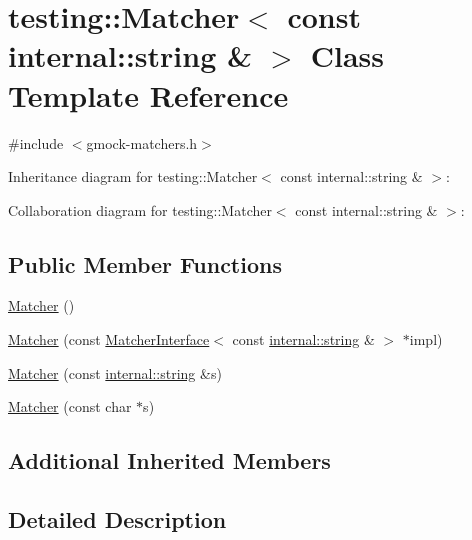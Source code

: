 \hypertarget{classtesting_1_1_matcher_3_01const_01internal_1_1string_01_6_01_4}{}\section{testing\+:\+:Matcher$<$ const internal\+:\+:string \& $>$ Class Template Reference}
\label{classtesting_1_1_matcher_3_01const_01internal_1_1string_01_6_01_4}


{\ttfamily \#include $<$gmock-\/matchers.\+h$>$}



Inheritance diagram for testing\+:\+:Matcher$<$ const internal\+:\+:string \& $>$\+:


Collaboration diagram for testing\+:\+:Matcher$<$ const internal\+:\+:string \& $>$\+:
\subsection*{Public Member Functions}
\begin{DoxyCompactItemize}
\item 
\hyperlink{classtesting_1_1_matcher_3_01const_01internal_1_1string_01_6_01_4_a0385eac840bb8fd52c93c51c2687dd6f}{Matcher} ()
\item 
\hyperlink{classtesting_1_1_matcher_3_01const_01internal_1_1string_01_6_01_4_a45670b268a87239be6520c1b0fbe015e}{Matcher} (const \hyperlink{classtesting_1_1_matcher_interface}{Matcher\+Interface}$<$ const \hyperlink{namespacetesting_1_1internal_a8e8ff5b11e64078831112677156cb111}{internal\+::string} \& $>$ $\ast$impl)
\item 
\hyperlink{classtesting_1_1_matcher_3_01const_01internal_1_1string_01_6_01_4_a3414bb154dfc4d19818a0c7878d662f4}{Matcher} (const \hyperlink{namespacetesting_1_1internal_a8e8ff5b11e64078831112677156cb111}{internal\+::string} \&s)
\item 
\hyperlink{classtesting_1_1_matcher_3_01const_01internal_1_1string_01_6_01_4_a7a98217eaa834207c4e51bb6d5283ed6}{Matcher} (const char $\ast$s)
\end{DoxyCompactItemize}
\subsection*{Additional Inherited Members}


\subsection{Detailed Description}

